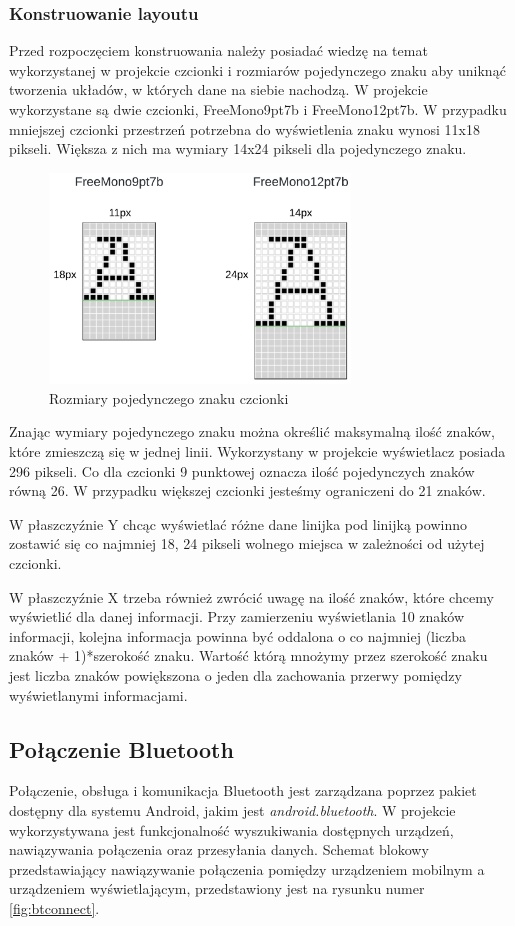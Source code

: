 \documentclass[a4paper,12pt, twoside]{article}
\begin{document}
    	\subsubsection{Konstruowanie layoutu}
    	Przed rozpoczęciem konstruowania należy posiadać wiedzę na temat wykorzystanej w projekcie czcionki i rozmiarów pojedynczego znaku aby uniknąć tworzenia układów, w których dane na siebie nachodzą. W projekcie wykorzystane są dwie czcionki, FreeMono9pt7b i FreeMono12pt7b. W przypadku mniejszej czcionki przestrzeń potrzebna do wyświetlenia znaku wynosi 11x18 pikseli. Większa z nich ma wymiary 14x24 pikseli dla pojedynczego znaku.
    	\begin{figure}[H]
    	        \centering
    			\includegraphics[width=8cm]{images/rozmiarczcionek.png}
    			\caption{Rozmiary pojedynczego znaku czcionki}
                \label{fig:font}
    	\end{figure}
    	
    	Znając wymiary pojedynczego znaku można określić maksymalną ilość znaków, które zmieszczą się w jednej linii. Wykorzystany w projekcie wyświetlacz posiada 296 pikseli. Co dla czcionki 9 punktowej oznacza ilość pojedynczych znaków równą 26. W przypadku większej czcionki jesteśmy ograniczeni do 21 znaków.
    	
    	W płaszczyźnie Y chcąc wyświetlać różne dane linijka pod linijką powinno zostawić się co najmniej 18, 24 pikseli wolnego miejsca w zależności od użytej czcionki.
    	
    	W płaszczyźnie X trzeba również zwrócić uwagę na ilość znaków, które chcemy wyświetlić dla danej informacji. Przy zamierzeniu wyświetlania 10 znaków informacji, kolejna informacja powinna być oddalona o co najmniej (liczba znaków + 1)*szerokość znaku. Wartość którą mnożymy przez szerokość znaku jest liczba znaków powiększona o jeden dla zachowania przerwy pomiędzy wyświetlanymi informacjami.
    	
    	\subsection{Połączenie Bluetooth}
    	Połączenie, obsługa i komunikacja Bluetooth jest zarządzana poprzez pakiet dostępny dla systemu Android, jakim jest \textit{android.bluetooth}\cite{android.bluetooth}. W projekcie wykorzystywana jest funkcjonalność wyszukiwania dostępnych urządzeń, nawiązywania połączenia oraz przesyłania danych. Schemat blokowy przedstawiający nawiązywanie połączenia pomiędzy urządzeniem mobilnym a urządzeniem wyświetlającym, przedstawiony jest na rysunku numer \ref{fig:btconnect}. 
    	
\end{document}
